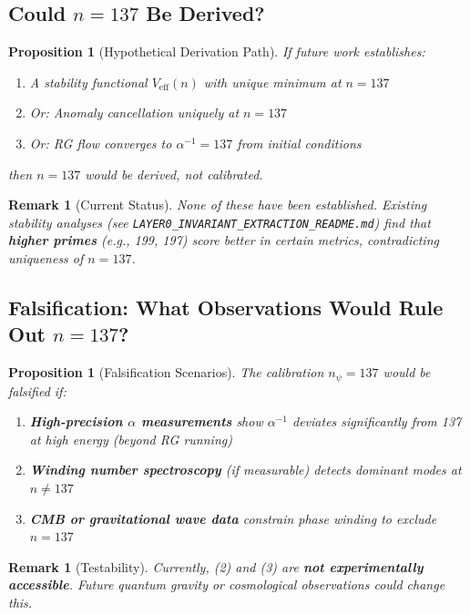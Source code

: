 \documentclass[12pt]{article}
\newtheorem{proposition}[definition]{Proposition}
\newtheorem{remark}[definition]{Remark}
\begin{document}
\subsection{Could $n=137$ Be Derived?}

\begin{proposition}[Hypothetical Derivation Path]
If future work establishes:
\begin{enumerate}
    \item A stability functional $V_{\text{eff}}(n)$ with unique minimum at $n=137$
    \item Or: Anomaly cancellation uniquely at $n=137$
    \item Or: RG flow converges to $\alpha^{-1} = 137$ from initial conditions
\end{enumerate}
then $n=137$ would be derived, not calibrated.
\end{proposition}

\begin{remark}[Current Status]
None of these have been established. Existing stability analyses (see \texttt{LAYER0\_INVARIANT\_EXTRACTION\_README.md}) find that \textbf{higher primes} (e.g., 199, 197) score better in certain metrics, contradicting uniqueness of $n=137$.
\end{remark}

\subsection{Falsification: What Observations Would Rule Out $n=137$?}

\begin{proposition}[Falsification Scenarios]
The calibration $n_\psi = 137$ would be falsified if:
\begin{enumerate}
    \item \textbf{High-precision $\alpha$ measurements} show $\alpha^{-1}$ deviates significantly from 137 at high energy (beyond RG running)
    \item \textbf{Winding number spectroscopy} (if measurable) detects dominant modes at $n \neq 137$
    \item \textbf{CMB or gravitational wave data} constrain phase winding to exclude $n=137$
\end{enumerate}
\end{proposition}

\begin{remark}[Testability]
Currently, (2) and (3) are \textbf{not experimentally accessible}. Future quantum gravity or cosmological observations could change this.
\end{remark}
\end{document}
